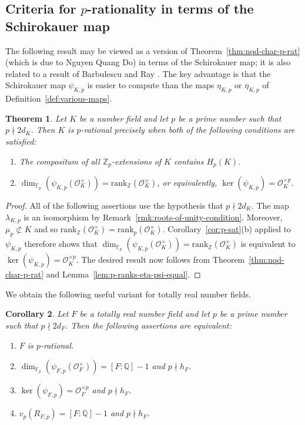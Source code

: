 \documentclass[12pt, a4paper, usenames]{amsart}
\newcommand{\Z}{\mathbb{Z}}
\newcommand{\Q}{\mathbb{Q}}
\theoremstyle{plain}
\newtheorem{theorem}{Theorem}[section]
\newtheorem{corollary}[theorem]{Corollary}
\theoremstyle{remark}
\theoremstyle{definition}
\newcommand{\rank}{\mathrm{rank}}
\begin{document}
\subsection{Criteria for $p$-rationality in terms of the Schirokauer map}\label{subsec:crit-p-rat-Schirokauer}
The following result may be viewed as a version of 
Theorem~\ref{thm:nqd-char-p-rat} (which is due to Nguyen Quang Do) in terms
of the Schirokauer map; it is also related to
a result of Barbulescu and Ray \cite[Lemma~4.2]{MR4158582}.
The key advantage is that the Schirokauer map $\psi_{K,p}$
is easier to compute than the maps $\eta_{K,p}$ or $\overline{\eta}_{K,p}$ of
Definition~\ref{def:various-maps}.

\begin{theorem}\label{thm:new-p-rat-criterion}
Let $K$ be a number field and let $p$ be a prime number such that $p \nmid 2d_{K}$. 
Then $K$ is $p$-rational precisely when both of the following conditions are
satisfied:
\begin{enumerate}
    \item The compositum of all $\Z_{p}$-extensions of $K$ contains $H_{p}(K)$.
    \item $\dim_{\mathbb{F}_{p}}(\psi_{K,p}(\mathcal{O}_{K}^{\times}))=\rank_{\Z}(\mathcal{O}_{K}^{\times})$, or equivalently, $\ker(\psi_{K,p})=\mathcal{O}_{K}^{\times p}$.
\end{enumerate}
\end{theorem}

\begin{proof}
All of the following assertions use the hypothesis that $p \nmid 2d_{K}$.
The map $\lambda_{K,p}$ is an isomorphism by Remark~\ref{rmk:roots-of-unity-condition}. 
Moreover, $\mu_{p} \not \subset K$ and so 
$\rank_{\Z}(\mathcal{O}_{K}^{\times})=\rank_{p}(\mathcal{O}_{K}^{\times})$.
Corollary~\ref{cor:p-sat}(b) 
applied to $\psi_{K,p}$ 
therefore shows that 
$\dim_{\mathbb{F}_{p}}(\psi_{K,p}(\mathcal{O}_{K}^{\times}))=\rank_{\Z}(\mathcal{O}_{K}^{\times})$ is equivalent to $\ker(\psi_{K,p})=\mathcal{O}_{K}^{\times p}$.
The desired result now follows from 
Theorem~\ref{thm:nqd-char-p-rat} and Lemma~\ref{lem:p-ranks-eta-psi-equal}.
\end{proof}

We obtain the following useful variant for totally real number fields.

\begin{corollary}\label{cor:tot-real-p-rat-iff}
Let $F$ be a totally real number field and  
let $p$ be a prime number such that $p \nmid 2d_{F}$.
Then the following assertions are equivalent:
\begin{enumerate}
\item $F$ is $p$-rational.
\item $\dim_{\mathbb{F}_{p}}(\psi_{F,p}(\mathcal{O}_{F}^{\times}))=[F:\Q]-1$ and $p \nmid h_{F}$.
\item $\ker(\psi_{F,p})=\mathcal{O}_{F}^{\times p}$ and $p \nmid h_{F}$.
\item $v_{p}(R_{F,p})=[F:\Q]-1$ and $p \nmid h_{F}$.
\end{enumerate}
\end{corollary}
\end{document}
